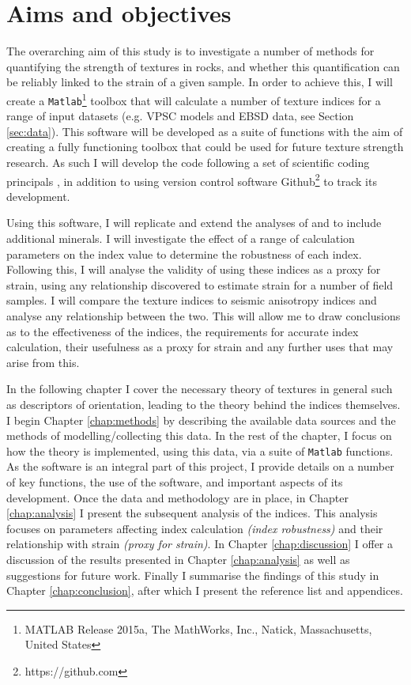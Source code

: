 \documentclass[a4paper,12pt,twoside]{report}
\numberwithin{equation}{chapter}
\begin{document}
\section{Aims and objectives} \label{sec:aims+objs}
	
The overarching aim of this study is to investigate a number of methods for quantifying the strength of textures in rocks, and whether this quantification can be reliably linked to the strain of a given sample. In order to achieve this, I will create a \texttt{Matlab}\footnote{MATLAB Release 2015a, The MathWorks, Inc., Natick, Massachusetts, United States} toolbox that will calculate a number of texture indices for a range of input datasets (e.g. VPSC models and EBSD data, see Section \ref{sec:data}). This software will be developed as a suite of functions with the aim of creating a fully functioning toolbox that could be used for future texture strength research. As such I will develop the code following a set of scientific coding principals \citep{Wilson2014}, in addition to using version control software Github\footnote{https://github.com} to track its development.   

Using this software, I will replicate and extend the analyses of \cite{Skemer} and \cite{Mainprice} to include additional minerals. I will investigate the effect of a range of calculation parameters on the index value to determine the robustness of each index. Following this, I will analyse the validity of using these indices as a proxy for strain, using any relationship discovered to estimate strain for a number of field samples. I will compare the texture indices to seismic anisotropy indices and analyse any relationship between the two. This will allow me to draw conclusions as to the effectiveness of the indices, the requirements for accurate index calculation, their usefulness as a proxy for strain and any further uses that may arise from this.  

In the following chapter I cover the necessary theory of textures in general such as descriptors of orientation, leading to the theory behind the indices themselves. I begin Chapter \ref{chap:methods} by describing the available data sources and the methods of modelling/collecting this data. In the rest of the chapter, I focus on how the theory is implemented, using this data, via a suite of \texttt{Matlab} functions. As the software is an integral part of this project, I provide details on a number of key functions, the use of the software, and important aspects of its development. Once the data and methodology are in place, in Chapter \ref{chap:analysis} I present the subsequent analysis of the indices. This analysis focuses on parameters affecting index calculation \emph{(index robustness)} and their relationship with strain \emph{(proxy for strain)}. In Chapter \ref{chap:discussion} I offer a discussion of the results presented in Chapter \ref{chap:analysis} as well as suggestions for future work. Finally I summarise the findings of this study in Chapter \ref{chap:conclusion}, after which I present the reference list and appendices.   
\end{document}
